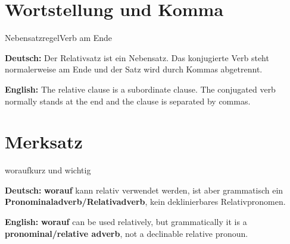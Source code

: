 \documentclass[a4paper,11pt]{article}
\newcommand{\GermanText}[1]{\textbf{Deutsch: }#1\par}
\newcommand{\EnglishText}[1]{{\small\color{SoftGray}\textbf{English: }#1\par}}
\begin{document}
\section{Wortstellung und Komma}

\begin{grammarentry}{Nebensatzregel}{Verb am Ende}

\GermanText{Der Relativsatz ist ein Nebensatz. Das konjugierte Verb steht normalerweise am Ende und der Satz wird durch Kommas abgetrennt.}

\EnglishText{The relative clause is a subordinate clause. The conjugated verb normally stands at the end and the clause is separated by commas.}

\end{grammarentry}

\section{Merksatz}

\begin{grammarentry}{worauf}{kurz und wichtig}

\GermanText{\textbf{worauf} kann relativ verwendet werden, ist aber grammatisch ein \textbf{Pronominaladverb/Relativadverb}, kein deklinierbares Relativpronomen.}

\EnglishText{\textbf{worauf} can be used relatively, but grammatically it is a \textbf{pronominal/relative adverb}, not a declinable relative pronoun.}

\end{grammarentry}
\end{document}
